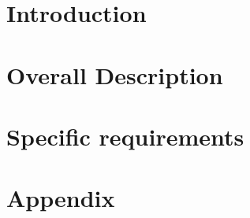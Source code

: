 \documentclass[11pt,a4paper,titlepage]{article}
\begin{document}




\section{Introduction}
\label{intro}



\section{Overall Description}
\label{description}



\section{Specific requirements}
\label{requirements}



\section{Appendix}
\label{appendix}



\printindex
\end{document}
